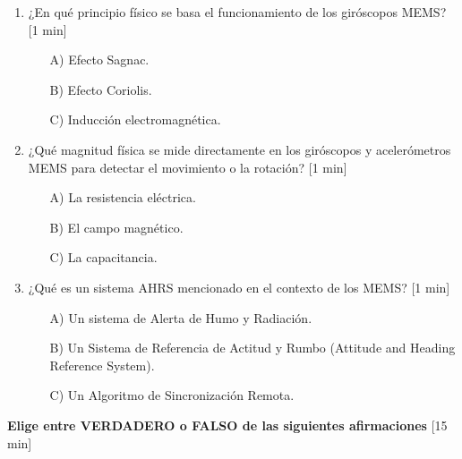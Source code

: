\begin{enumerate}
\item ¿En qué principio físico se basa el funcionamiento de los giróscopos MEMS? [1 min]

	\begin{itemize}
		\item[A)] Efecto Sagnac.
		\item[B)] Efecto Coriolis.
		\item[C)] Inducción electromagnética.\\
	\end{itemize}

\item ¿Qué magnitud física se mide directamente en los giróscopos y acelerómetros MEMS para detectar el movimiento o la rotación? [1 min]

	\begin{itemize}
		\item[A)] La resistencia eléctrica.
		\item[B)] El campo magnético.
		\item[C)] La capacitancia.\\
	\end{itemize}

\item ¿Qué es un sistema AHRS mencionado en el contexto de los MEMS? [1 min]
	\begin{itemize}
		\item[A)]  Un sistema de Alerta de Humo y Radiación.
		\item[B)] Un Sistema de Referencia de Actitud y Rumbo (Attitude and Heading Reference System).
		\item[C)] Un Algoritmo de Sincronización Remota.\\
	\end{itemize}
\end{enumerate}





\begin{nosangria}
\Large{\textbf{Elige entre VERDADERO o FALSO de las siguientes afirmaciones} [15 min]}
\end{nosangria}

